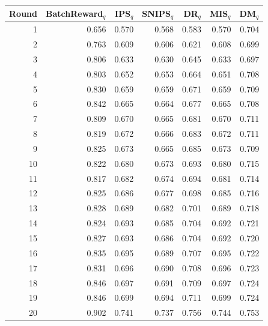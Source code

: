 \begin{tabular}{rrrrrrr}
\toprule
Round & BatchReward$_q$ & IPS$_q$ & SNIPS$_q$ & DR$_q$ & MIS$_q$ & DM$_q$ \\
\midrule
1 & 0.656 & 0.570 & 0.568 & 0.583 & 0.570 & 0.704 \\
2 & 0.763 & 0.609 & 0.606 & 0.621 & 0.608 & 0.699 \\
3 & 0.806 & 0.633 & 0.630 & 0.645 & 0.633 & 0.697 \\
4 & 0.803 & 0.652 & 0.653 & 0.664 & 0.651 & 0.708 \\
5 & 0.830 & 0.659 & 0.659 & 0.671 & 0.659 & 0.709 \\
6 & 0.842 & 0.665 & 0.664 & 0.677 & 0.665 & 0.708 \\
7 & 0.809 & 0.670 & 0.665 & 0.681 & 0.670 & 0.711 \\
8 & 0.819 & 0.672 & 0.666 & 0.683 & 0.672 & 0.711 \\
9 & 0.825 & 0.673 & 0.665 & 0.685 & 0.673 & 0.709 \\
10 & 0.822 & 0.680 & 0.673 & 0.693 & 0.680 & 0.715 \\
11 & 0.817 & 0.682 & 0.674 & 0.694 & 0.681 & 0.714 \\
12 & 0.825 & 0.686 & 0.677 & 0.698 & 0.685 & 0.716 \\
13 & 0.828 & 0.689 & 0.682 & 0.701 & 0.689 & 0.718 \\
14 & 0.824 & 0.693 & 0.685 & 0.704 & 0.692 & 0.721 \\
15 & 0.827 & 0.693 & 0.686 & 0.704 & 0.692 & 0.720 \\
16 & 0.835 & 0.695 & 0.689 & 0.707 & 0.695 & 0.722 \\
17 & 0.831 & 0.696 & 0.690 & 0.708 & 0.696 & 0.723 \\
18 & 0.846 & 0.697 & 0.691 & 0.709 & 0.697 & 0.724 \\
19 & 0.846 & 0.699 & 0.694 & 0.711 & 0.699 & 0.724 \\
20 & 0.902 & 0.741 & 0.737 & 0.756 & 0.744 & 0.753 \\
\bottomrule
\end{tabular}
